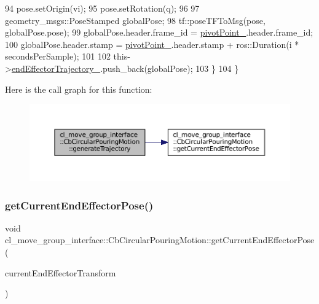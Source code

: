 \begin{DoxyCode}
94             pose.setOrigin(vi);
95             pose.setRotation(q);
96 
97             geometry\_msgs::PoseStamped globalPose;
98             tf::poseTFToMsg(pose, globalPose.pose);
99             globalPose.header.frame\_id = \hyperlink{classcl__move__group__interface_1_1CbCircularPouringMotion_a4c100d8ba3e57f7ddfb614017d115fca}{pivotPoint\_}.header.frame\_id;
100             globalPose.header.stamp = \hyperlink{classcl__move__group__interface_1_1CbCircularPouringMotion_a4c100d8ba3e57f7ddfb614017d115fca}{pivotPoint\_}.header.stamp + ros::Duration(i * 
      secondsPerSample);
101 
102             this->\hyperlink{classcl__move__group__interface_1_1CbMoveEndEffectorTrajectory_ae13dfd31ea3660646e03882f0c2c29f0}{endEffectorTrajectory\_}.push\_back(globalPose);
103         \}
104     \}
\end{DoxyCode}
Here is the call graph for this function\+:
\nopagebreak
\begin{figure}[H]
\begin{center}
\leavevmode
\includegraphics[width=350pt]{classcl__move__group__interface_1_1CbCircularPouringMotion_a9150bb3731082aad3af2d7d6e067a344_cgraph}
\end{center}
\end{figure}
\mbox{\label{classcl__move__group__interface_1_1CbCircularPouringMotion_a0cc72cc5233ecb0c264621d4d9501b30}} 
\subsubsection{\texorpdfstring{get\+Current\+End\+Effector\+Pose()}{getCurrentEndEffectorPose()}}
{\footnotesize\ttfamily void cl\+\_\+move\+\_\+group\+\_\+interface\+::\+Cb\+Circular\+Pouring\+Motion\+::get\+Current\+End\+Effector\+Pose (\begin{DoxyParamCaption}\item[{tf\+::\+Stamped\+Transform \&}]{current\+End\+Effector\+Transform }\end{DoxyParamCaption})}



